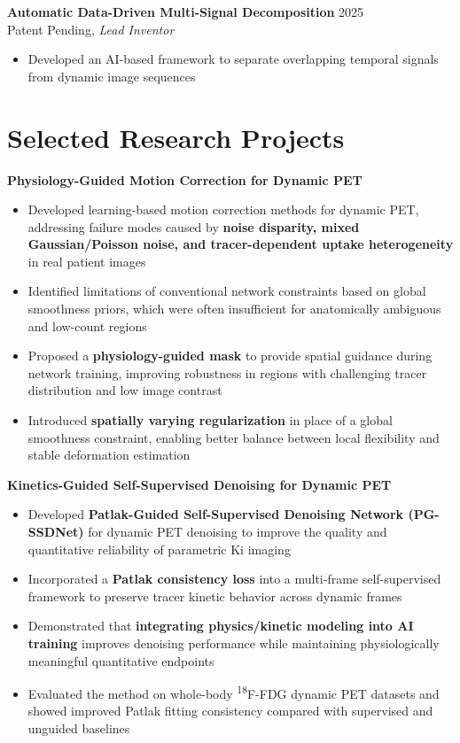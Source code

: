 \textbf{Automatic Data-Driven Multi-Signal Decomposition} \hfill 2025 \\
Patent Pending, \textit{Lead Inventor}
\begin{itemize}[leftmargin=*]
\item Developed an AI-based framework to separate overlapping temporal signals from dynamic image sequences
\end{itemize}

\section{Selected Research Projects}

\textbf{Physiology-Guided Motion Correction for Dynamic PET}
\begin{itemize}[leftmargin=*]
\item Developed learning-based motion correction methods for dynamic PET, addressing failure modes caused by \textbf{noise disparity, mixed Gaussian/Poisson noise, and tracer-dependent uptake heterogeneity} in real patient images
\item Identified limitations of conventional network constraints based on global smoothness priors, which were often insufficient for anatomically ambiguous and low-count regions
\item Proposed a \textbf{physiology-guided mask} to provide spatial guidance during network training, improving robustness in regions with challenging tracer distribution and low image contrast
\item Introduced \textbf{spatially varying regularization} in place of a global smoothness constraint, enabling better balance between local flexibility and stable deformation estimation
\end{itemize}

\textbf{Kinetics-Guided Self-Supervised Denoising for Dynamic PET}
\begin{itemize}[leftmargin=*]
\item Developed \textbf{Patlak-Guided Self-Supervised Denoising Network (PG-SSDNet)} for dynamic PET denoising to improve the quality and quantitative reliability of parametric Ki imaging
\item Incorporated a \textbf{Patlak consistency loss} into a multi-frame self-supervised framework to preserve tracer kinetic behavior across dynamic frames
\item Demonstrated that \textbf{integrating physics/kinetic modeling into AI training} improves denoising performance while maintaining physiologically meaningful quantitative endpoints
\item Evaluated the method on whole-body \textsuperscript{18}F-FDG dynamic PET datasets and showed improved Patlak fitting consistency compared with supervised and unguided baselines
\end{itemize}

